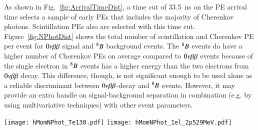 As shown in Fig.~\ref{fig:ArrivalTimeDist}, a time cut of 33.5~ns on the PE arrival time selects a sample of early PEs that includes the majority of Cherenkov photons. Scintillation PEs also are selected with this time cut. Figure~\ref{fig:NPhotDist} shows the total number of scintillation and Cherenkov PE per event for $0\nu\beta\beta$ signal and $^{8}B$ background events. 
The $^{8}B$ events do have a higher number of Cherenkov PEs on average compared to $0\nu\beta\beta$ events because of the single electron in $^{8}B$ events has a higher energy than the two electrons from $0\nu\beta\beta$ decay.   This difference, though, is not significant enough to be used alone as a reliable discriminant between $0\nu\beta\beta$-decay and $^{8}B$ events.  However, it may provide an extra handle on signal-background separation in combination (e.g. by using multivariative techniques) with other event parameters.

\begin{figure*}[ht]
  \centering
  \texttt{[image: hMomNPhot\_Te130.pdf]}
  \texttt{[image: hMomNPhot\_1el\_2p529MeV.pdf]}
  \caption{Number of Cherenkov (\emph{dashed red line}), scintillation
    (\emph{dotted blue line}), and total (\emph{solid black line}) PEs
    for the simulation of 1000 $^{130}$Te 0{\nbb} decay (left panel)
    and $^8$B (\emph{right panel}) events.}
\label{fig:NPhotDist}
\end{figure*}


